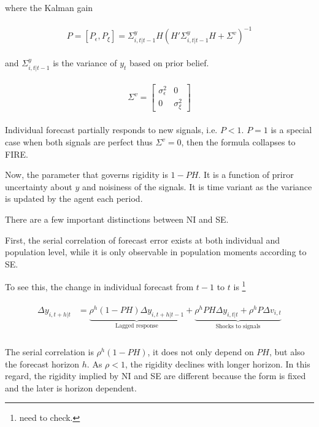 \documentclass[]{article}
\begin{document}
where the Kalman gain  


\begin{eqnarray}
\begin{aligned}
 P = [P_\epsilon,P_\xi]= \Sigma^y_{i,t|t-1} H(H'\Sigma^y_{i,t|t-1} H + \Sigma^v)^{-1} 
 \end{aligned}
 \end{eqnarray}
 
and $\Sigma^y_{i,t|t-1}$  is the variance of  $y_t$ based on prior belief.

\begin{eqnarray}
\begin{aligned}
 \Sigma^v =  \left[ \begin{matrix} 
  \sigma^2_{\epsilon} &  0 \\ 
  0 & \sigma^2_\xi \end{matrix}\right] 
\end{aligned}
\end{eqnarray}

Individual forecast partially responds to new signals, i.e. $P<1$. $P=1$ is a special case when both signals are perfect thus $\Sigma^v = 0$, then the formula collapses to FIRE. 

Now, the parameter that governs rigidity is $1-PH$. It is a function of priror uncertainty about $y$ and noisiness of the signals. It is time variant as the variance is updated by the agent each period.  

There are a few important distinctions between NI and SE. 

First, the serial correlation of forecast error exists at both individual and population level, while it is only observable in population moments according to SE. 

To see this, the change in individual forecast from $t-1$ to $t$ is \footnote{need to check.}

\begin{eqnarray}
\begin{aligned}
\Delta y_{i,t+h|t} & = \underbrace{\rho^h (1-PH)\Delta y_{i,t+h|t-1}}_{\text{Lagged response}} + \underbrace{\rho^hPH \Delta y_{i,t|t} + \rho^h P\Delta v_{i,t}}_{\text{Shocks to signals}}\\
\end{aligned}
\end{eqnarray}

The serial correlation is $\rho^h(1-PH)$, it does not only depend on $PH$, but also the forecast horizon $h$. As $\rho<1$, the rigidity declines with longer horizon. In this regard, the rigidity implied by NI and SE are different because the form is fixed and the later is horizon dependent.  
\end{document}
